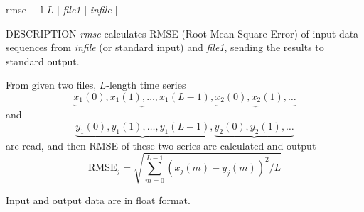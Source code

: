 % 
% 
% 
% 
%                                                                        
%
\hypertarget{rmse}{}

\begin{synopsis}
\item [rmse] [ --l $L$ ] {\em file1} [ {\em infile} ]
\end{synopsis}

\begin{qsection}{DESCRIPTION}
{\em rmse} calculates RMSE (Root Mean Square Error) of input data sequences 
from {\em infile} (or standard input) and {\em file1}, 
sending the results to standard output.

From given two files, $L$-length time series 
\begin{displaymath}
  \underbrace{x_1(0),x_1(1),\dots,x_1(L-1)},\underbrace{x_2(0),x_2(1),\dots}
\end{displaymath}
and
\begin{displaymath}
  \underbrace{y_1(0),y_1(1),\dots,y_1(L-1)},\underbrace{y_2(0),y_2(1),\dots}
\end{displaymath}
are read,
and then RMSE of these two series are calculated and output
\begin{displaymath}
\mathrm{RMSE}_j = \sqrt{\sum_{m=0}^{L-1} (x_j(m)-y_j(m))^2/L}
\end{displaymath}

Input and output data are in float format.
\end{qsection}

